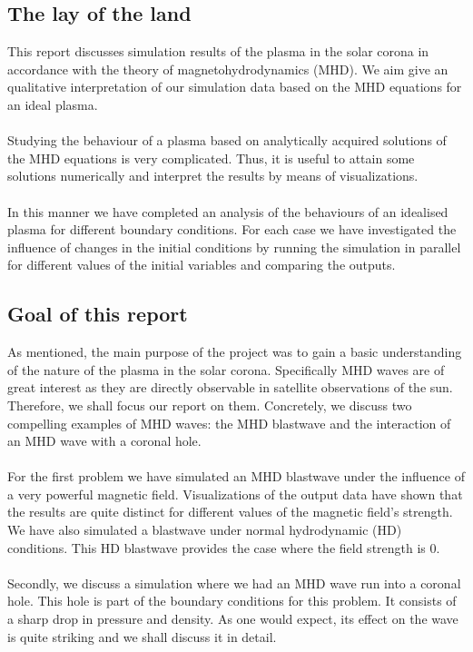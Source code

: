 

\subsection*{The lay of the land}

This report discusses simulation results of the plasma in the solar corona in accordance with the theory of magnetohydrodynamics (MHD). We aim give an qualitative interpretation of our simulation data based on the MHD equations for an ideal plasma.\\
\\
Studying the behaviour of a plasma based on analytically acquired solutions of the MHD equations is very complicated. Thus, it is useful to attain some solutions numerically and interpret the results by means of visualizations.\\
\\
In this manner we have completed an analysis of the behaviours of an idealised plasma for different boundary conditions. For each case we have investigated the influence of changes in the initial conditions by running the simulation in parallel for different values of the initial variables and comparing the outputs. 

\subsection*{Goal of this report}

As mentioned, the main purpose of the project was to gain a basic understanding of the nature of the plasma in the solar corona. Specifically MHD waves are of great interest as they are directly observable in satellite observations of the sun. Therefore, we shall focus our report on them. Concretely, we discuss two compelling examples of MHD waves: the MHD blastwave and the interaction of an MHD wave with a coronal hole.\\
\\
For the first problem we have simulated an MHD blastwave under the influence of a very powerful magnetic field. Visualizations of the output data have shown that the results are quite distinct for different values of the magnetic field's strength. We have also simulated a blastwave under normal hydrodynamic (HD) conditions. This HD blastwave provides the case where the field strength is $0$.\\
\\
Secondly, we discuss a simulation where we had an MHD wave run into a coronal hole. This hole is part of the boundary conditions for this problem. It consists of a sharp drop in pressure and density. As one would expect, its effect on the wave is quite striking and we shall discuss it in detail. 

